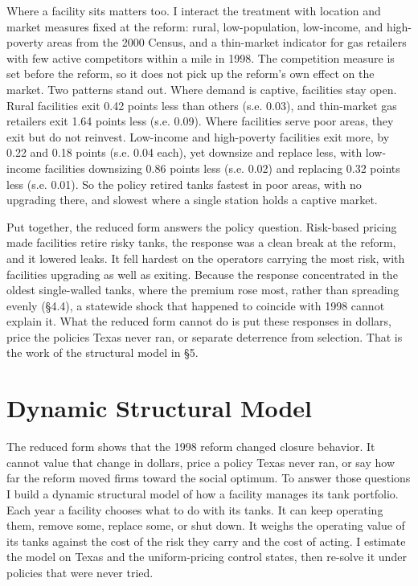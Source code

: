 \documentclass[
  12pt,
]{article}
\begin{document}
Where a facility sits matters too. I interact the treatment with
location and market measures fixed at the reform: rural, low-population,
low-income, and high-poverty areas from the 2000 Census, and a
thin-market indicator for gas retailers with few active competitors
within a mile in 1998. The competition measure is set before the reform,
so it does not pick up the reform's own effect on the market. Two
patterns stand out. Where demand is captive, facilities stay open. Rural
facilities exit 0.42 points less than others (s.e. 0.03), and
thin-market gas retailers exit 1.64 points less (s.e. 0.09). Where
facilities serve poor areas, they exit but do not reinvest. Low-income
and high-poverty facilities exit more, by 0.22 and 0.18 points (s.e.
0.04 each), yet downsize and replace less, with low-income facilities
downsizing 0.86 points less (s.e. 0.02) and replacing 0.32 points less
(s.e. 0.01). So the policy retired tanks fastest in poor areas, with no
upgrading there, and slowest where a single station holds a captive
market.

Put together, the reduced form answers the policy question. Risk-based
pricing made facilities retire risky tanks, the response was a clean
break at the reform, and it lowered leaks. It fell hardest on the
operators carrying the most risk, with facilities upgrading as well as
exiting. Because the response concentrated in the oldest single-walled
tanks, where the premium rose most, rather than spreading evenly (§4.4),
a statewide shock that happened to coincide with 1998 cannot explain it.
What the reduced form cannot do is put these responses in dollars, price
the policies Texas never ran, or separate deterrence from selection.
That is the work of the structural model in §5.

\section{Dynamic Structural Model}\label{dynamic-structural-model}

The reduced form shows that the 1998 reform changed closure behavior. It
cannot value that change in dollars, price a policy Texas never ran, or
say how far the reform moved firms toward the social optimum. To answer
those questions I build a dynamic structural model of how a facility
manages its tank portfolio. Each year a facility chooses what to do with
its tanks. It can keep operating them, remove some, replace some, or
shut down. It weighs the operating value of its tanks against the cost
of the risk they carry and the cost of acting. I estimate the model on
Texas and the uniform-pricing control states, then re-solve it under
policies that were never tried.
\end{document}
